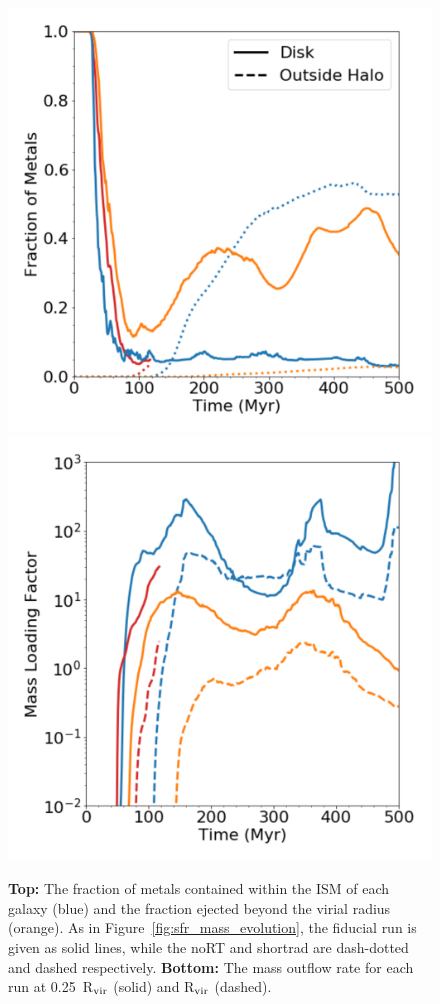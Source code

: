 \documentclass[twocolumn]{aastex62}
\begin{document}
\begin{figure}
\centering
\includegraphics[width=0.95\linewidth]{metal_retention}\\
\includegraphics[width=0.95\linewidth]{mass_loading_comparison}
\caption{{\bf Top:} The fraction of metals contained within the ISM of each galaxy (blue) and the fraction ejected beyond the virial radius (orange). As in Figure~\ref{fig:sfr_mass_evolution}, the fiducial run is given as solid lines, while the noRT and shortrad are dash-dotted and dashed respectively. {\bf Bottom:} The mass outflow rate for each run at 0.25~R$_{\rm vir}$ (solid) and R$_{\rm vir}$ (dashed).}
\label{fig:metal_retention}
\end{figure}
\end{document}
